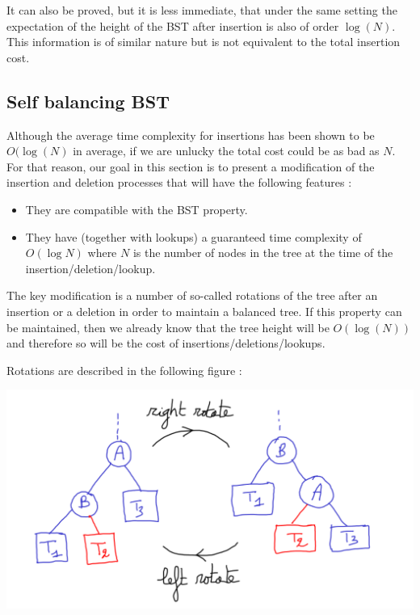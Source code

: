 \documentclass[12pt]{article}
\theoremstyle{plain}
\theoremstyle{remark}
\begin{document}
It can also be proved, but it is less immediate, that under the same setting the
expectation of the height of the BST after insertion is also of order $\log(N).$
This information is of similar nature but is not equivalent to the total
insertion cost. 

\subsection{Self balancing BST}\label{subsec:sb}

Although the average time complexity for insertions has been shown to be
$O(\log(N)$ in average, if we are unlucky the total cost could be as bad as $N$.
For that reason, our goal in this section is to present a modification of the
insertion and deletion processes that will have the following features : 
\begin{itemize}
	\item They are compatible with the BST property.
	\item They have (together with lookups) a guaranteed time complexity 
		of $O(\log N)$ where $N$ is the number of nodes in the tree at
		the time of the insertion/deletion/lookup. 
\end{itemize}

The key modification is a number of so-called rotations of the tree after an
insertion or a deletion in order to maintain a balanced tree. If this property
can be maintained, then we already know that the tree height will be  
$O(\log(N))$ and therefore so will be the cost of insertions/deletions/lookups.

\medskip

Rotations are described in the following figure : 

\begin{center}
	\includegraphics[width=14cm]{data/rotation.pdf}
\end{center}
\end{document}
